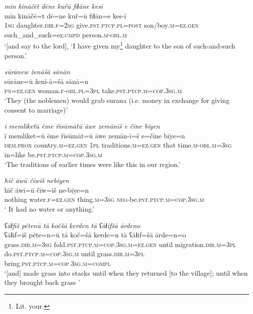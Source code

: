 \ea \label{RE.49}
\textit{min kināčēt dēne kuřū fiɫāne kesī} \\ 
\gll min kināčē=t dē=ne kuř=ū fiɫān=e kes-ī \\ 
 \textsc{1sg} daughter\textsc{.dir}\textsc{.f}\textsc{=\textsc{2sg}} give\textsc{.pst}\textsc{.ptcp}\textsc{.pl}\textsc{=\textsc{post}} son/boy\textsc{.m}\textsc{=ez.gen} such\_and\_such=ez\textsc{.cmpd} person\textsc{.m}\textsc{-obl}\textsc{.m} \\ 
\glt `[and say to the lord], ‘I have given my\footnote{Lit. your.} daughter to the son of such-and-such person.'
\z 
 
\ea \label{RE.59}
\textit{sūrānew ženāšā sānān} \\ 
\gll sūrāne=ū ženī-ā=šā sānā=n \\ 
 \textsc{pn}\textsc{=ez.gen} woman\textsc{.f}\textsc{-obl}\textsc{.pl}\textsc{=3pl} take\textsc{.pst}\textsc{.ptcp}\textsc{.m}\textsc{=cop}\textsc{.3sg}\textsc{.m} \\ 
\glt `They (the noblemen) would grab surana (i.e. money in exchange for giving consent to marriage)'
\z 
 
\ea \label{RE.62}
\textit{ī memliketū ēme řisūmātū āwe zemānīš e čīne bīyen} \\ 
\gll ī memliket=ū ēme řisūmāt=ū āwe zemān-ī=š e=čīne bīye=n \\ 
 \textsc{dem.prox} country\textsc{.m}\textsc{=ez.gen} \textsc{1pl} traditions\textsc{.m}\textsc{=ez.gen} that time\textsc{.m}\textsc{-obl}\textsc{.m}\textsc{=3sg} in=like be\textsc{.pst}\textsc{.ptcp}\textsc{.m}\textsc{=cop}\textsc{.3sg}\textsc{.m} \\ 
\glt `The traditions of earlier times were like this in our region.'
\z 
 
\ea \label{ŽE.7}
\textit{hīč āwū čīwiš nebīyen} \\ 
\gll hīč āwī=ū čīw=iš ne-bīye=n \\ 
 nothing water\textsc{.f}\textsc{\textsc{=ez.gen}} thing\textsc{.m}\textsc{=3sg} \textsc{neg-}be\textsc{.pst}\textsc{.ptcp}\textsc{.m}\textsc{=cop}\textsc{.3sg}\textsc{.m} \\ 
\glt ` It had no water or anything.'
\z 
 
\ea \label{ŽE.13}
\textit{ʕāɫfiš pētenū tā kočšā kerden tā ʕāɫifšā ārdeno} \\ 
\gll ʕāɫif=iš pēte=n=ū tā koč=šā kerde=n tā ʕāɫif=šā ārde=n=o \\ 
 grass\textsc{.dir}\textsc{.m}\textsc{=3sg} fold\textsc{.pst}\textsc{.ptcp}\textsc{.m}\textsc{=cop}\textsc{.3sg}\textsc{.m}\textsc{\textsc{=ez.gen}} until migration\textsc{.dir}\textsc{.m}\textsc{=3pl} do\textsc{.pst}\textsc{.ptcp}\textsc{.m}\textsc{=cop}\textsc{.3sg}\textsc{.m} until grass\textsc{.dir}\textsc{.m}\textsc{=3pl} bring\textsc{.pst}\textsc{.ptcp}\textsc{.m}\textsc{=cop}\textsc{.3sg}\textsc{.m}\textsc{=compl} \\ 
\glt `[and] made grass into stacks until when they returned [to the village]; until when they brought back grass '
\z 
 
